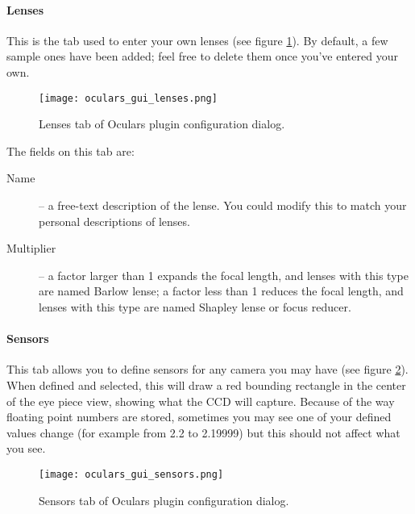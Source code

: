 \paragraph{Lenses}

This is the tab used to enter your own lenses (see figure \ref{fig:plugins:Oculars:Gui:Lenses}). By default, a few sample ones have been added; feel free to delete them once you've entered your own.

\begin{figure}[ht]\centering
\texttt{[image: oculars\_gui\_lenses.png]}
\caption{Lenses tab of Oculars plugin configuration dialog.}
\label{fig:plugins:Oculars:Gui:Lenses}
\end{figure}

The fields on this tab are:
\begin{description}
\item[Name] -- a free-text description of the lense. You could modify this to match your personal descriptions of lenses.
\item[Multiplier] -- a factor larger than 1 expands the focal length, and lenses with this type are named Barlow lense; 
                     a factor less   than 1 reduces the focal length, and lenses with this type are named Shapley lense or focus reducer.
\end{description}

\paragraph{Sensors}

This tab allows you to define sensors for any camera you may have (see figure \ref{fig:plugins:Oculars:Gui:Sensors}). 
When defined and selected, this will draw a red bounding rectangle in the center of the eye piece view, showing what the CCD will capture. 
Because of the way floating point numbers are stored, sometimes you may see one of your defined values change (for example from 2.2 to 2.19999) but this should not affect what you see.

\begin{figure}[ht]\centering
\texttt{[image: oculars\_gui\_sensors.png]}
\caption{Sensors tab of Oculars plugin configuration dialog.}
\label{fig:plugins:Oculars:Gui:Sensors}
\end{figure}


